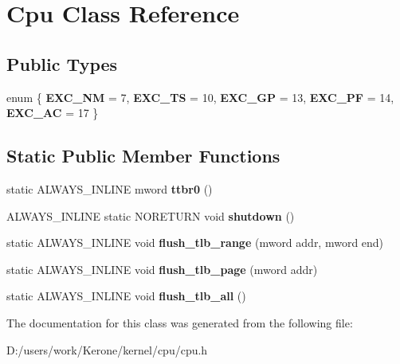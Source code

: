 \section{Cpu Class Reference}
\label{class_cpu}
\subsection*{Public Types}
\begin{DoxyCompactItemize}
\item 
\mbox{\label{class_cpu_aac7052533b1e16425e65b352ccce6b24}} 
enum \{ \newline
{\bfseries E\+X\+C\+\_\+\+NM} = 7, 
{\bfseries E\+X\+C\+\_\+\+TS} = 10, 
{\bfseries E\+X\+C\+\_\+\+GP} = 13, 
{\bfseries E\+X\+C\+\_\+\+PF} = 14, 
\newline
{\bfseries E\+X\+C\+\_\+\+AC} = 17
 \}
\end{DoxyCompactItemize}
\subsection*{Static Public Member Functions}
\begin{DoxyCompactItemize}
\item 
\mbox{\label{class_cpu_a08c9042224bcf08e072f4400bec119c5}} 
static A\+L\+W\+A\+Y\+S\+\_\+\+I\+N\+L\+I\+NE mword {\bfseries ttbr0} ()
\item 
\mbox{\label{class_cpu_acae9f9a816c8188d48936084d07ad953}} 
A\+L\+W\+A\+Y\+S\+\_\+\+I\+N\+L\+I\+NE static N\+O\+R\+E\+T\+U\+RN void {\bfseries shutdown} ()
\item 
\mbox{\label{class_cpu_a2a4bb7a52abbb92daaa7369754937656}} 
static A\+L\+W\+A\+Y\+S\+\_\+\+I\+N\+L\+I\+NE void {\bfseries flush\+\_\+tlb\+\_\+range} (mword addr, mword end)
\item 
\mbox{\label{class_cpu_a80645cce7ea1450434a69e33832f4fc9}} 
static A\+L\+W\+A\+Y\+S\+\_\+\+I\+N\+L\+I\+NE void {\bfseries flush\+\_\+tlb\+\_\+page} (mword addr)
\item 
\mbox{\label{class_cpu_a53705c5d77106f182c4071125edef887}} 
static A\+L\+W\+A\+Y\+S\+\_\+\+I\+N\+L\+I\+NE void {\bfseries flush\+\_\+tlb\+\_\+all} ()
\end{DoxyCompactItemize}


The documentation for this class was generated from the following file\+:\begin{DoxyCompactItemize}
\item 
D\+:/users/work/\+Kerone/kernel/cpu/cpu.\+h\end{DoxyCompactItemize}
